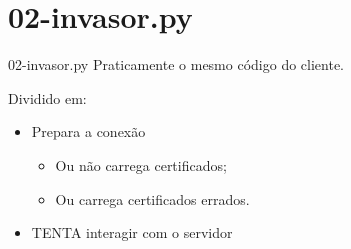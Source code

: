 \documentclass[xcolor=dvipsnames,table]{beamer}
\begin{document}
\section{02-invasor.py}
\begin{frame}{02-invasor.py}
	Praticamente o mesmo código do cliente.

	Dividido em:
	\begin{itemize}
		\item Prepara a conexão
		\begin{itemize}
			\item Ou não carrega certificados;
			\item Ou carrega certificados errados.
		\end{itemize}
		\item TENTA interagir com o servidor
	\end{itemize}
\end{frame}

\begin{frame}[plain]{}
    \maketitle
\end{frame}


	
\end{document}

